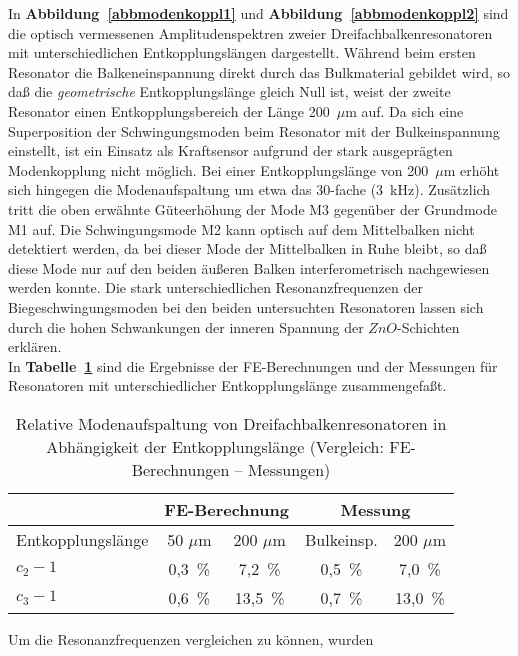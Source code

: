 In {\bf Abbildung~\ref{abbmodenkoppl1}} und
{\bf Abbildung~\ref{abbmodenkoppl2}} sind die optisch vermessenen
Amplitudenspektren zweier Dreifachbalkenresonatoren mit unterschiedlichen
Entkopplungslängen dargestellt. Während beim ersten Resonator die
Balkeneinspannung direkt durch das Bulkmaterial gebildet wird, so daß die
{\em geometrische} Entkopplungslänge gleich Null ist, weist der
zweite Resonator einen Entkopplungsbereich der Länge 200~$\mu$m auf.
Da sich eine Superposition der Schwingungsmoden beim Resonator mit der
Bulkeinspannung einstellt, ist ein Einsatz als Kraftsensor aufgrund der
stark ausgeprägten Modenkopplung nicht möglich. Bei einer Entkopplungslänge
von 200~$\mu$m erhöht sich hingegen die Modenaufspaltung um etwa das
30-fache (3~kHz). Zusätzlich tritt die oben erwähnte
Güteerhöhung der Mode M3 gegenüber der Grundmode M1 auf. Die Schwingungsmode
M2 kann optisch auf dem Mittelbalken nicht detektiert werden, da bei dieser
Mode der Mittelbalken in Ruhe bleibt, so daß diese Mode nur auf den beiden
äußeren Balken interferometrisch nachgewiesen werden konnte. Die stark
unterschiedlichen Resonanzfrequenzen der Biegeschwingungsmoden bei den
beiden untersuchten Resonatoren lassen sich durch die hohen Schwankungen
der inneren Spannung der $ZnO$-Schichten erklären. \\
In {\bf Tabelle~\ref{tabuntkoppl}} sind die Ergebnisse der FE-Berechnungen
und der Messungen für Resonatoren mit unterschiedlicher Entkopplungslänge
zusammengefaßt.
\begin{table}[htb]
\caption{\label{tabuntkoppl}
 Relative Modenaufspaltung von Dreifachbalkenresonatoren in Abhängigkeit
 der Entkopplungslänge (Vergleich: FE-Berechnungen -- Messungen)}
\begin{center}
\begin{tabular}{|l||c|c||c|c|}
\hline
 & \multicolumn{2}{c||}{FE-Berechnung} & \multicolumn{2}{c|}{Messung} \\
\hline
Entkopplungslänge & 50 $\mu$m & 200 $\mu$m & Bulkeinsp. & 200 $\mu$m \\
\hline \hline
 $c_{2}-1$ & 0,3~\% & 7,2~\% & 0,5~\% & 7,0~\% \\
\hline
 $c_{3}-1$ & 0,6~\% & 13,5~\% & 0,7~\% & 13,0~\% \\
\hline
\end{tabular}
\end{center}
\end{table}
Um die Resonanzfrequenzen vergleichen zu können, wurden

